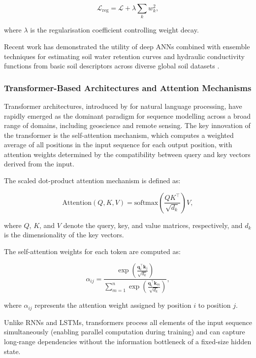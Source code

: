 \documentclass[land,article,submit,pdftex,moreauthors]{Definitions/mdpi}
\numberwithin{equation}{section}
\begin{document}
\begin{equation}
\mathcal{L}_{\text{reg}}
=
\mathcal{L}
+
\lambda
\sum_{k} w_k^2,
\end{equation}

where $\lambda$ is the regularisation coefficient controlling weight decay.

Recent work has demonstrated the utility of deep ANNs combined with ensemble techniques for estimating soil water retention curves and hydraulic conductivity functions from basic soil descriptors across diverse global soil datasets \citep{Lemenkova202403, Lemenkova202410}.

\subsubsection{Transformer-Based Architectures and Attention Mechanisms}

Transformer architectures, introduced by \citet{vaswani2017attention} for natural language processing, have rapidly emerged as the dominant paradigm for sequence modelling across a broad range of domains, including geoscience and remote sensing. The key innovation of the transformer is the self-attention mechanism, which computes a weighted average of all positions in the input sequence for each output position, with attention weights determined by the compatibility between query and key vectors derived from the input.

The scaled dot-product attention mechanism is defined as:

\begin{equation}
\text{Attention}(Q,K,V)
=
\text{softmax}
\left(
\frac{QK^\top}{\sqrt{d_k}}
\right)V,
\end{equation}

where $Q$, $K$, and $V$ denote the query, key, and value matrices, respectively, and $d_k$ is the dimensionality of the key vectors.

The self-attention weights for each token are computed as:

\begin{equation}
\alpha_{ij}
=
\frac{
\exp \left(
\frac{\mathbf{q}_i^\top \mathbf{k}_j}{\sqrt{d_k}}
\right)
}{
\sum_{m=1}^{n}
\exp \left(
\frac{\mathbf{q}_i^\top \mathbf{k}_m}{\sqrt{d_k}}
\right)
},
\end{equation}

where $\alpha_{ij}$ represents the attention weight assigned by position $i$ to position $j$.

Unlike RNNs and LSTMs, transformers process all elements of the input sequence simultaneously (enabling parallel computation during training) and can capture long-range dependencies without the information bottleneck of a fixed-size hidden state.
\end{document}
